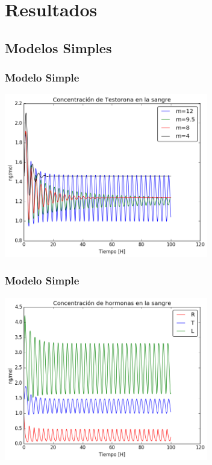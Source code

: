 \documentclass[10pt]{beamer}
\begin{document}
\section{Resultados}
\subsection{Modelos Simples}
\begin{frame}
\frametitle{Modelo Simple}
\begin{center}
 \includegraphics[width=3.5in]{imagenes/Graficas/Modelos_Simples/testosterona1.png}
\end{center}
\end{frame}

\begin{frame}
\frametitle{Modelo Simple}
\begin{center}
 \includegraphics[width=3.5in]{imagenes/Graficas/Modelos_Simples/hormonas1.png}
\end{center}
\end{frame}
\end{document}
